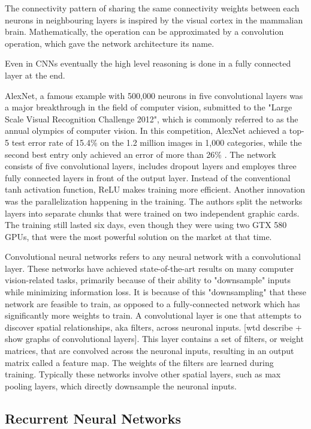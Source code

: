 The connectivity pattern of sharing the same connectivity weights between each neurons in neighbouring layers is inspired by the visual cortex in the mammalian brain.
Mathematically, the operation can be approximated by a convolution operation, which gave the network architecture its name. 

Even in CNNs eventually the high level reasoning is done in a fully connected layer at the end.

AlexNet, a famous example with 500,000 neurons in five convolutional layers \cite{AlexNet} was a major breakthrough in the field of computer vision, submitted to the "Large Scale Visual Recognition Challenge 2012", which is commonly referred to as the annual olympics of computer vision.
In this competition, AlexNet achieved a top-5 test error rate of 15.4\% on the 1.2 million images in 1,000 categories, while the second best entry only achieved an error of more than 26\% \cite{ILSVRC15}. 
The network consists of five convolutional layers, includes dropout layers and employes three fully connected layers in front of the output layer. Instead of the conventional tanh activation function, ReLU makes training more efficient.
Another innovation was the parallelization happening in the training. The authors split the networks layers into separate chunks that were trained on two independent graphic cards. The training still lasted six days, even though they were using two GTX 580 GPUs, that were the most powerful solution on the market at that time.


Convolutional neural networks refers to any neural network with a convolutional layer.  These networks have achieved state-of-the-art results on many computer vision-related tasks, primarily because of their ability to "downsample" inputs while minimizing information loss.  It is because of this "downsampling" that these network are feasible to train, as opposed to a fully-connected network which has significantly more weights to train.  A convolutional layer is one that attempts to discover spatial relationships, aka filters, across neuronal inputs. [wtd describe + show graphs of convolutional layers].  This layer contains a set of filters, or weight matrices, that are convolved across the neuronal inputs, resulting in an output matrix called a feature map.  The weights of the filters are learned during training.  Typically these networks involve other spatial layers, such as max pooling layers, which directly downsample the neuronal inputs.

\subsection{Recurrent Neural Networks}

